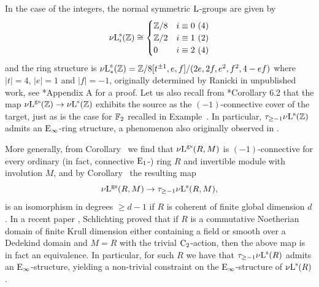 \begin{example}
\label{example:normal-L-of-Z}%
In the case of the integers, the normal symmetric $\operatorname L$-groups are given by
\[
{\nu\!\operatorname L}_i^{\mathrm{s}}(\mathbb Z) \cong \begin{cases} \mathbb Z/8 & i \equiv 0 \ (4) \\ \mathbb Z/2 & i \equiv 1 \ (2) \\ 0 & i \equiv 2 \ (4)\end{cases}
\]
and the ring structure is ${\nu\!\operatorname L}^{\mathrm{s}}_\ast(\mathbb Z) = \mathbb Z/8[t^{\pm 1},e,f]/(2e,2f,e^2,f^2,4-ef)$ where $|t|=4$, $|e| =1$ and $|f| = -1$, originally determined by Ranicki in unpublished work, see \cite{HLN}*{Appendix A} for a proof. 
Let us also recall from \cite{HLN}*{Corollary 6.2} that the map ${\nu\!\operatorname L}^{\mathrm{gs}}(\mathbb{Z}) \to {\nu\!\operatorname L}^{\mathrm{s}}(\mathbb{Z})$ exhibits the source as the $(-1)$-connective cover of the target, just as is the case for $\mathbb{F}_2$ recalled in Example~.
In particular, $\tau_{\geq-1}{\nu\!\operatorname L}^{\mathrm{s}}(\mathbb{Z})$ admits an ${\mathrm{E}_{\infty}}$-ring structure, a phenomenon also originally observed in \cite{HLN}.

More generally, from Corollary~ we find that ${\nu\!\operatorname L}^{\mathrm{gs}}(R,M)$ is $(-1)$-connective for every ordinary (in fact, connective ${\mathrm{E}_{1}}$-) ring $R$ and invertible module with involution $M$, and by Corollary~ the resulting map
\[
{\nu\!\operatorname L}^{\mathrm{gs}}(R,M) \to \tau_{\geq -1}{\nu\!\operatorname L}^{\mathrm{s}}(R,M),
\]
is an isomorphism in degrees $\geq d-1$ if $R$ is coherent of finite global dimension $d$. In a recent paper \cite{Schlichting-genuine}, Schlichting proved that if $R$ is a commutative Noetherian domain of finite Krull dimension either containing a field or smooth over a Dedekind domain and $M=R$ with the trivial $\mathrm{C_2}$-action, then the above map is in fact an equivalence.
In particular, for such $R$ %
we have that $\tau_{\geq -1}{\nu\!\operatorname L}^{\mathrm{s}}(R)$ admits an ${\mathrm{E}_{\infty}}$-structure, yielding a non-trivial constraint on the ${\mathrm{E}_{\infty}}$-structure of ${\nu\!\operatorname L}^{\mathrm{s}}(R)$. 
\end{example}


